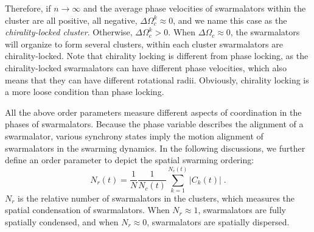 \documentclass{article}
\begin{document}
Therefore, if $n\rightarrow\infty$ and the average phase velocities of swarmalators within the cluster are all positive, all negative, $\Delta \Omega _{c}^{k}\approx0$, and we name this case as the \textit{chirality-locked cluster}. Otherwise, $\Delta \Omega _{c}^{k}>0$. 
When $\Delta\Omega_c \approx 0$, the swarmalators will organize to form several clusters, within each cluster swarmalators are chirality-locked. 
Note that chirality locking is different from phase locking, as the chirality-locked swarmalators can have different phase velocities, which also means that they can have different rotational radii. 
Obviously, chirality locking is a more loose condition than phase locking. 

All the above order parameters measure different aspects of coordination in the phases of swarmalators. Because the phase variable describes the alignment of a swarmalator, various synchrony states imply the motion alignment of swarmalators in the swarming dynamics. 
In the following discussions, we further define an order parameter to depict the spatial swarming ordering:
\begin{equation}
    \label{eq:relativeNumber}
    N_r\left( t \right) =\frac{1}{N}\frac{1}{N_c\left( t \right)}\sum_{k=1}^{N_c\left( t \right)}{\left| C_k\left( t \right) \right|}\;.
\end{equation}
$N_r$ is the relative number of swarmalators in the clusters, which measures the spatial condensation of swarmalators. When $N_r\approx 1$, swarmalators are fully spatially condensed, and when $N_r\approx 0$, swarmalators are spatially dispersed. 

\end{document}

